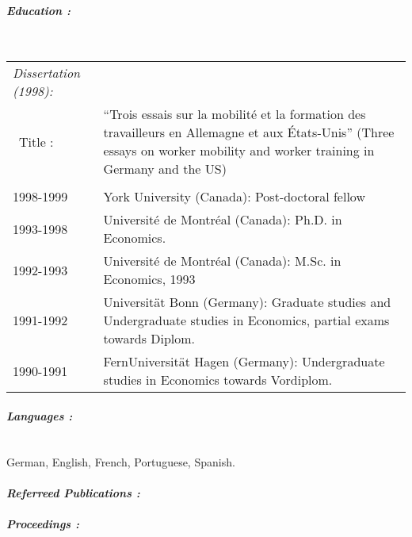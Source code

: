 \documentclass[10pt,letterpaper]{report}
\begin{document}
\paragraph{\it \bf Education :}
\ \\
\begin{tabular}{lp{4in}}
	\it Dissertation (1998): \\
	\ Title :&``Trois essais sur la mobilit\'e et la formation des travailleurs en Allemagne et aux
	\'Etats-Unis'' (Three essays on worker mobility and worker training in
	Germany and the US)\\
	\\
	1998-1999   &    York University (Canada): Post-doctoral fellow \\
	1993-1998   &    Universit\'e de Montr\'eal (Canada): Ph.D. in Economics. \\
	1992-1993   &    Universit\'e de Montr\'eal (Canada): M.Sc. in Economics, 1993 \\
	1991-1992   &    Universit\"at Bonn (Germany): Graduate studies and Undergraduate studies in Economics, partial exams towards Diplom.     \\
	1990-1991   &    FernUniversit\"at Hagen (Germany): Undergraduate studies in Economics towards Vordiplom. \\
\end{tabular}

\paragraph{\it \bf Languages :}
\ \\
German, English, French, Portuguese, Spanish. 


\nocite{*}

\paragraph{\it \bf Referreed Publications :}%
\printbibliography[type=article,heading=none]
\paragraph{\it \bf Proceedings :}%
\printbibliography[filter=collective,heading=none]
\end{document}
